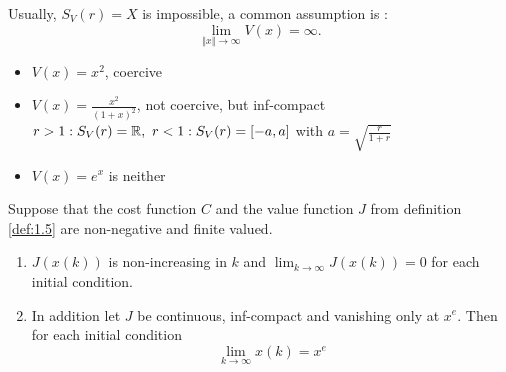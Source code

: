Usually, \(S_V(r)=X\) is impossible, a common assumption is :
\[\lim_{\Vert x\Vert \to\infty} V(x)=\infty.\]

\begin{example}
    \begin{itemize}
        \item \(V(x)=x^2\), coercive
        \item \(V(x)=\frac{x^2}{(1+x)^2}\), not coercive, but inf-compact \(r>1: S_V(r)=\mathbb{R},\ r<1: S_V(r)=[-a,a]\) with \(a=\sqrt{\frac{r}{1+r}}\)
        \item \(V(x)=e^x\) is neither
    \end{itemize}
\end{example}

\begin{lemma}\label{lem:1.08}
    Suppose that the cost function \(C\) and the value function \(J\) from definition \ref{def:1.5} are non-negative and 
    finite valued.
    \begin{enumerate}
        \item \(J(x(k))\) is non-increasing in \(k\) and \(\lim_{k\to\infty} J(x(k))=0\) for each initial condition.
        \item In addition let \(J\) be continuous, inf-compact and vanishing only at \(x^e\). Then for each initial condition 
            \[\lim_{k\to\infty} x(k)=x^e\]
    \end{enumerate} 
\end{lemma}

